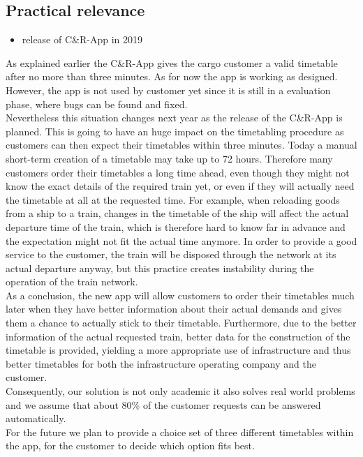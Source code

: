 \subsection{Practical relevance}
\begin{itemize}
  \item release of C\&R-App in 2019 \\
\end{itemize}
As explained earlier the C\&R-App gives the cargo customer a valid timetable after no more than three minutes. As for now the app is working as designed. However, the app is not used by customer yet since it is still in a evaluation phase, where bugs can be found and fixed. \\
Nevertheless this situation changes next year as the release of the C\&R-App is planned. This is going to have an huge impact on the timetabling procedure as customers can then expect their timetables within three minutes. Today a manual short-term creation of a timetable may take up to 72 hours. Therefore many customers order their timetables a long time ahead, even though they might not know the exact details of the required train yet, or even if they will actually need the timetable at all at the requested time.
For example, when reloading goods from a ship to a train, changes in the timetable of the ship will affect the actual departure time of the train, which is therefore hard to know far in advance and the expectation might not fit the actual time anymore. In order to provide a good service to the customer, the train will be disposed through the network at its actual departure anyway, but this practice creates instability during the operation of the train network.\\
As a conclusion, the new app will allow customers to order their timetables much later when they have better information about their actual demands and gives them a chance to actually stick to their timetable. Furthermore, due to the better information of the actual requested train, better data for the construction of the timetable is provided, yielding a more appropriate use of infrastructure and thus better timetables for both the infrastructure operating company and the customer. \\
Consequently, our solution is not only academic it also solves real world problems and we assume that about 80\% of the customer requests can be answered automatically. \\
For the future we plan to provide a choice set of three different timetables within the app, for the customer to decide which option fits best. \\
